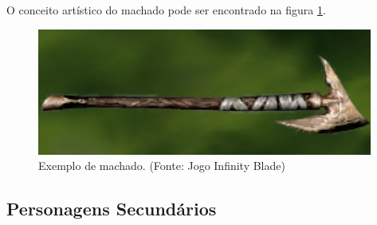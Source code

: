 \begin{itemize}
O conceito artístico do machado pode ser encontrado na figura 
\ref{img:machado}.

\begin{figure}[H]
 \centering
 \includegraphics[scale=1]{Imagens/machado01.png}
 \caption{Exemplo de machado. (Fonte: Jogo Infinity Blade)}
\label{img:machado}
\end{figure}

\end{itemize}

\subsection{Personagens Secundários}
